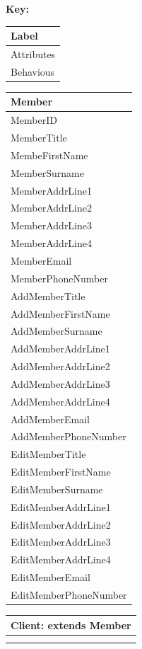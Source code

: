 \begin{flushleft}
\textbf{Key:}
\begin{tabular}{|p{4cm}|}
	\hline
	Label \\ \hline
	Attributes \\ \hline	
	Behavious \\ \hline
\end{tabular}


\end{flushleft}

\begin{tabular}{|p{4cm}|}
	\hline
	\textbf{Member} \\ \hline
	MemberID \\
	MemberTitle \\
	MembeFirstName \\
	MemberSurname \\
	MemberAddrLine1 \\
	MemberAddrLine2 \\
	MemberAddrLine3 \\
	MemberAddrLine4 \\
	MemberEmail \\
	MemberPhoneNumber \\ \hline	
		AddMemberTitle \\
		AddMemberFirstName \\
		AddMemberSurname \\
		AddMemberAddrLine1 \\
		AddMemberAddrLine2 \\
		AddMemberAddrLine3 \\
		AddMemberAddrLine4 \\
		AddMemberEmail \\
		AddMemberPhoneNumber \\ 
		EditMemberTitle \\
		EditMemberFirstName \\
		EditMemberSurname \\
		EditMemberAddrLine1 \\
		EditMemberAddrLine2 \\
		EditMemberAddrLine3 \\
		EditMemberAddrLine4 \\
		EditMemberEmail \\
		EditMemberPhoneNumber \\ \hline
\end{tabular}

\begin{tabular}{|p{5cm}|}
	\hline
	\textbf{Client:} extends \textbf{Member} \\ \hline
		 \\ \hline
		 \\ \hline
\end{tabular}



